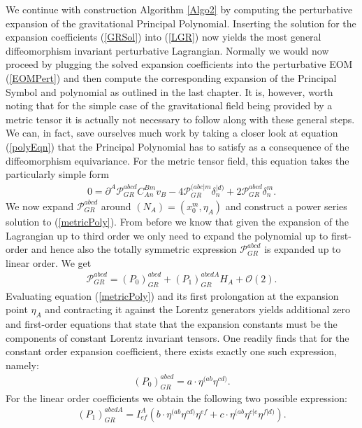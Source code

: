 \documentclass[a4paper,12pt, DIV=14, BCOR=5mm, twoside, headsepline, numbers=noenddot]{scrbook}
\begin{document}
We continue with construction Algorithm \ref{Algo2} by computing the perturbative expansion of the gravitational Principal Polynomial. Inserting the solution for the expansion coefficients (\ref{GRSol}) into (\ref{LGR}) now yields the most general diffeomorphism invariant perturbative Lagrangian. Normally we would now proceed by plugging the solved expansion coefficients into the perturbative EOM (\ref{EOMPert}) and then compute the corresponding expansion of the Principal Symbol and polynomial as outlined in the last chapter. It is, however, worth noting that for the simple case of the gravitational field being provided by a metric tensor it is actually not necessary to follow along with these general steps. We can, in fact, save ourselves much work by taking a closer look at equation (\ref{polyEqn}) that the Principal Polynomial has to satisfy as a consequence of the diffeomorphism equivariance. For the metric tensor field, this equation takes the particularly simple form
\begin{align}\label{metricPoly}
    0 = \partial^A \mathcal{P}_{GR}^{abcd} C_{An}^{Bm} v_B - 4\mathcal{P}_{GR}^{(abc\vert m} \delta_n^{\vert d)} + 2 \mathcal{P}_{GR}^{abcd} \delta^m_n.
\end{align}
We now expand $\mathcal{P}_{GR}^{abcd}$ around $(N_{A}) = (x_0^m, \eta_A)$ and construct a power series solution to (\ref{metricPoly}). From before we know that given the expansion of the Lagrangian up to third order we only need to expand the polynomial up to first-order and hence also the totally symmetric expression $\mathcal{P}_{GR}^{abcd}$ is expanded up to linear order. We get 
\begin{align}
    \mathcal{P}_{GR}^{abcd} = (P_0)_{GR}^{abcd} + (P_1)_{GR}^{abcdA} H_A + \mathcal{O}(2).
\end{align}
Evaluating equation (\ref{metricPoly}) and its first prolongation at the expansion point $\eta_A$ and contracting it against the Lorentz generators yields additional zero and first-order equations that state that the expansion constants must be the components of constant Lorentz invariant tensors. One readily finds that for the constant order expansion coefficient, there exists exactly one such expression, namely:
\begin{align}
   (P_0)_{GR}^{abcd} = a \cdot \eta^{(ab} \eta^{cd)}. 
\end{align}
For the linear order coefficients we obtain the following two possible expression:
\begin{align}
    (P_1)_{GR}^{abcdA} = I^A_{ef} \left (b \cdot \eta^{(ab} \eta^{cd)}  \eta^{ef} + c \cdot \eta^{(ab} \eta^{c \vert e} \eta^{f \vert d)} \right ).
\end{align}
\end{document}
